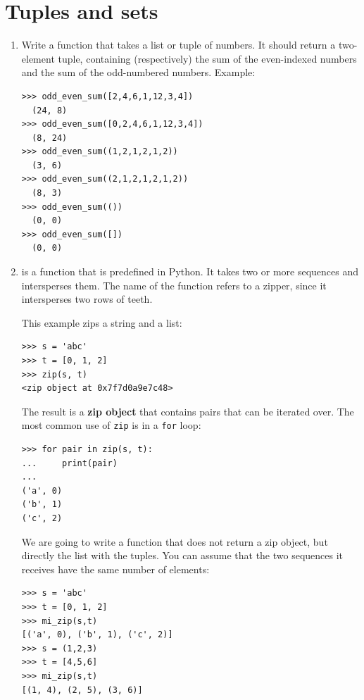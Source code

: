 \documentclass[
  fontsize=10pt,
  a4paper,
]{scrartcl}
\begin{document}
\section{Tuples and sets}


\begin{enumerate}

\item Write a  function that takes a list or tuple of numbers. It should return a two-element tuple, containing (respectively) the sum of the even-indexed numbers and the sum of the odd-numbered numbers. Example:

\begin{Verbatim}[frame=single, label={\em tests example}]
>>> odd_even_sum([2,4,6,1,12,3,4])
  (24, 8)
>>> odd_even_sum([0,2,4,6,1,12,3,4])
  (8, 24)
>>> odd_even_sum((1,2,1,2,1,2))
  (3, 6)
>>> odd_even_sum((2,1,2,1,2,1,2))
  (8, 3)
>>> odd_even_sum(())
  (0, 0)
>>> odd_even_sum([])
  (0, 0)
\end{Verbatim}


\item {} is a function that is predefined in Python. It takes two or more sequences and intersperses them. The name of the function refers to a zipper, since it intersperses two rows of teeth.

This example zips a string and a list:

\begin{Verbatim}[frame=single]
>>> s = 'abc'
>>> t = [0, 1, 2]
>>> zip(s, t)
<zip object at 0x7f7d0a9e7c48>
\end{Verbatim}

The result is a {\bf zip object} that contains pairs that can be iterated over. The most common use of {\tt zip} is in a {\tt for} loop:

\begin{Verbatim}[frame=single]
>>> for pair in zip(s, t):
...     print(pair)
...
('a', 0)
('b', 1)
('c', 2)
\end{Verbatim}
%

We are going to write a  function that does not return a zip object, but directly the list with the tuples. You can assume that the two sequences it receives have the same number of elements:

\begin{Verbatim}[frame=single]
>>> s = 'abc'
>>> t = [0, 1, 2]
>>> mi_zip(s,t)
[('a', 0), ('b', 1), ('c', 2)]
>>> s = (1,2,3)
>>> t = [4,5,6]
>>> mi_zip(s,t)
[(1, 4), (2, 5), (3, 6)]
\end{Verbatim}


\end{enumerate}
\end{document}
